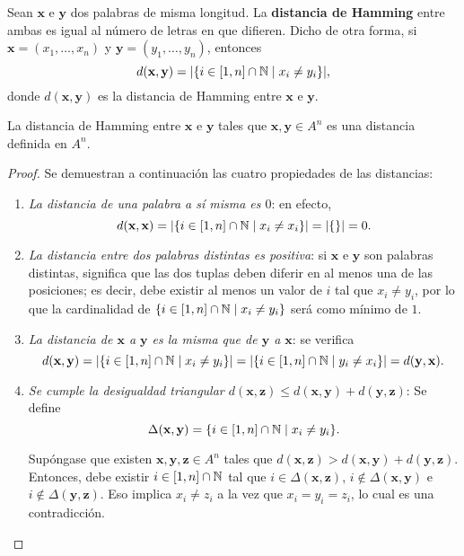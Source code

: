 \begin{definition}
	Sean $\textbf{x}$ e $\textbf{y}$ dos palabras de misma longitud. La \textbf{distancia de Hamming} entre ambas es igual al número de letras en que difieren. Dicho de otra forma, si $\textbf{x} = (x_1, \hdots, x_n)$ y $\textbf{y} = (y_1, \hdots, y_n)$, entonces
	\[d(\textbf{x}, \textbf{y}) = |\{i\in[1, n]\cap\mathbb{N} \mid x_i \neq y_i\}|,\]
	donde $d(\textbf{x}, \textbf{y})$ es la distancia de Hamming entre $\textbf{x}$ e $\textbf{y}$.
\end{definition}

\begin{theorem}
	La distancia de Hamming entre  $\textbf{x}$ e $\textbf{y}$ tales que $\textbf{x}, \textbf{y} \in A^n$ es una distancia definida en $A^n$.
\end{theorem}

\begin{proof}
	Se demuestran a continuación las cuatro propiedades de las distancias:
	\begin{enumerate}
		\item \textit{La distancia de una palabra a sí misma es $0$}: en efecto,
		\[d(\textbf{x}, \textbf{x}) = |\{i\in[1,n]\cap\mathbb{N} \mid x_i \neq x_i\}| = |\{\}| = 0.\]
		\item \textit{La distancia entre dos palabras distintas es positiva}: si $\textbf{x}$ e $\textbf{y}$ son palabras distintas, significa que las dos tuplas deben diferir en al menos una de las posiciones; es decir, debe existir al menos un valor de $i$ tal que $x_i \neq y_i$, por lo que la cardinalidad de $\{i \in [1, n]\cap\mathbb{N} \mid x_i \neq y_i\}$ será como mínimo de $1$.
		\item \textit{La distancia de $\textbf{x}$ a $\textbf{y}$ es la misma que de $\textbf{y}$ a $\textbf{x}$}: se verifica
		\[d(\textbf{x}, \textbf{y}) = |\{i\in[1,n]\cap\mathbb{N} \mid x_i \neq y_i\}| = |\{i\in[1,n]\cap\mathbb{N} \mid y_i \neq x_i\}| = d(\textbf{y}, \textbf{x}).\]
		\item \textit{Se cumple la desigualdad triangular $d(\textbf{x}, \textbf{z}) \leq d(\textbf{x}, \textbf{y}) + d(\textbf{y}, \textbf{z})$}:
		Se define
		\[\Delta(\textbf{x}, \textbf{y}) = \{i\in[1,n]\cap\mathbb{N} \mid x_i \neq y_i\}.\]
		
		Supóngase que existen $\textbf{x}, \textbf{y}, \textbf{z} \in A^n$ tales que $d(\textbf{x}, \textbf{z}) > d(\textbf{x}, \textbf{y}) + d(\textbf{y}, \textbf{z})$. Entonces, debe existir $i \in [1, n]\cap\mathbb{N}$ tal que $i \in \Delta(\textbf{x}, \textbf{z})$, $i \notin \Delta(\textbf{x}, \textbf{y})$ e $i \notin \Delta(\textbf{y}, \textbf{z})$. Eso implica $x_i \neq z_i$ a la vez que $x_i = y_i = z_i$, lo cual es una contradicción.
	\end{enumerate}
\end{proof}

